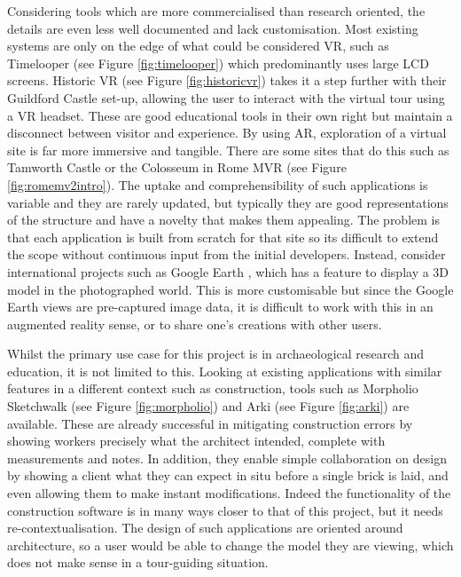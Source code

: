 \documentclass[12pt, a4paper]{article}
\begin{document}
Considering tools which are more commercialised than research oriented, the details are even less well documented and lack customisation. Most existing systems are only on the edge of what could be considered VR, such as Timelooper \cite{existing:timelooper} (see Figure \ref{fig:timelooper}) which predominantly uses large LCD screens. Historic VR \cite{existing:historicvr} (see Figure \ref{fig:historicvr}) takes it a step further with their Guildford Castle set-up, allowing the user to interact with the virtual tour using a VR headset. These are good educational tools in their own right but maintain a disconnect between visitor and experience. By using AR, exploration of a virtual site is far more immersive and tangible. There are some sites that do this such as Tamworth Castle \cite{existing:tamworth} or the Colosseum in Rome MVR \cite{existing:romemvr} (see Figure \ref{fig:romemv2intro}). The uptake and comprehensibility of such applications is variable and they are rarely updated, but typically they are good representations of the structure and have a novelty that makes them appealing. The problem is that each application is built from scratch for that site so its difficult to extend the scope without continuous input from the initial developers. Instead, consider international projects such as Google Earth \cite{existing:googleearth}, which has a feature to display a 3D model in the photographed world. This is more customisable but since the Google Earth views are pre-captured image data, it is difficult to work with this in an augmented reality sense, or to share one's creations with other users.

Whilst the primary use case for this project is in archaeological research and education, it is not limited to this. Looking at existing applications with similar features in a different context such as construction, tools such as Morpholio Sketchwalk \cite{existing:morpholio} (see Figure \ref{fig:morpholio}) and Arki \cite{existing:arki} (see Figure \ref{fig:arki}) are available. These are already successful in mitigating construction errors by showing workers precisely what the architect intended, complete with measurements and notes. In addition, they enable simple collaboration on design \cite{existing:ardesign} by showing a client what they can expect in situ before a single brick is laid, and even allowing them to make instant modifications. Indeed the functionality of the construction software is in many ways closer to that of this project, but it needs re-contextualisation. The design of such applications are oriented around architecture, so a user would be able to change the model they are viewing, which does not make sense in a tour-guiding situation.
\end{document}
